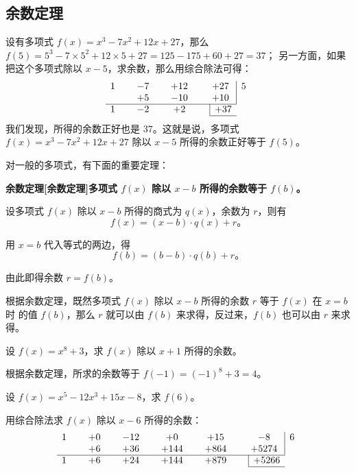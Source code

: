 \subsection{余数定理}\label{subsec:1-3}

设有多项式 $f(x) = x^3 - 7x^2 + 12x + 27$，那么 $f(5) = 5^3 - 7 \times 5^2 + 12 \times 5 + 27 = 125 - 175 + 60 + 27 = 37$；
另一方面，如果把这个多项式除以 $x - 5$，求余数，那么用综合除法可得：
$$
\begin{array}{*{3}{c@{\hspace{0.8cm}}}c|l}
    1 & -7 & +12 & +27 & 5\\
      & +5 & -10 & +10 & \\
    \cline{1-4}
    1 & -2 & +2 & \multicolumn{1}{|r}{ +37 } & \\
    \cline{4-4}
\end{array}
$$
我们发现，所得的余数正好也是 $37$。这就是说，多项式 $f(x) = x^3 - 7x^2 + 12x + 27$ 除以
$x - 5$ 所得的余数正好等于 $f(5)$。

对一般的多项式，有下面的重要定理：

\textbf{余数定理[余数定理]\footnotemark\quad 多项式 $f(x)$ 除以 $x - b$ 所得的余数等于 $f(b)$。}

\zhengming 设多项式 $f(x)$ 除以 $x - b$ 所得的商式为 $q(x)$，余数为 $r$，则有
$$ f(x) = (x - b) \cdot q(x) + r \text{。} $$

用 $x = b$ 代入等式的两边，得
$$ f(b) = (b - b) \cdot q(b) + r \text{。} $$

由此即得余数 $r = f(b)$。

根据余数定理，既然多项式 $f(x)$ 除以 $x - b$ 所得的余数 $r$ 等于 $f(x)$ 在 $x = b$ 时
的值 $f(b)$，那么 $r$ 就可以由 $f(b)$ 来求得，反过来，$f(b)$ 也可以由 $r$ 来求得。

\liti 设 $f(x) = x^8 + 3$，求 $f(x)$ 除以 $x + 1$ 所得的余数。

\jie 根据余数定理，所求的余数等于 $f(-1) = (-1)^8 + 3 = 4$。


\liti 设 $f(x) = x^5 - 12x^3 + 15x - 8$，求 $f(6)$。

\jie 用综合除法求 $f(x)$ 除以 $x - 6$ 所得的余数：
$$
\begin{array}{*{5}{c@{\hspace{0.8cm}}}c|l}
    1 & +0 & -12 &   +0 &  +15 &    -8 & 6 \\
      & +6 & +36 & +144 & +864 & +5274 &   \\
    \cline{1-6}
    1 & +6 & +24 & +144 & +879 & \multicolumn{1}{|r}{ +5266 } & \\
    \cline{6-6}
\end{array}
$$

